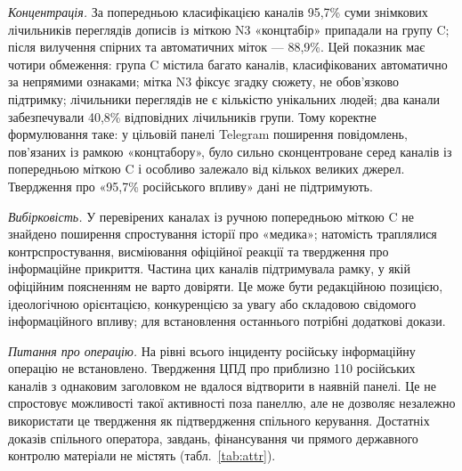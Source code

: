 \emph{Концентрація.} За попередньою класифікацією каналів 95,7\% суми знімкових лічильників переглядів дописів із міткою N3 «концтабір» припадали на групу C; після вилучення спірних та автоматичних міток --- 88,9\%. Цей показник має чотири обмеження: група C містила багато каналів, класифікованих автоматично за непрямими ознаками; мітка N3 фіксує згадку сюжету, не обов'язково підтримку; лічильники переглядів не є кількістю унікальних людей; два канали забезпечували 40,8\% відповідних лічильників групи. Тому коректне формулювання таке: у цільовій панелі Telegram поширення повідомлень, пов'язаних із рамкою «концтабору», було сильно сконцентроване серед каналів із попередньою міткою C і особливо залежало від кількох великих джерел. Твердження про «95,7\% російського впливу» дані не підтримують.

\emph{Вибірковість.} У перевірених каналах із ручною попередньою міткою C не знайдено поширення спростування історії про «медика»; натомість траплялися контрспростування, висміювання офіційної реакції та твердження про інформаційне прикриття. Частина цих каналів підтримувала рамку, у якій офіційним поясненням не варто довіряти. Це може бути редакційною позицією, ідеологічною орієнтацією, конкуренцією за увагу або складовою свідомого інформаційного впливу; для встановлення останнього потрібні додаткові докази.

\emph{Питання про операцію.} На рівні всього інциденту російську інформаційну операцію не встановлено. Твердження ЦПД про приблизно 110 російських каналів з однаковим заголовком не вдалося відтворити в наявній панелі. Це не спростовує можливості такої активності поза панеллю, але не дозволяє незалежно використати це твердження як підтвердження спільного керування. Достатніх доказів спільного оператора, завдань, фінансування чи прямого державного контролю матеріали не містять (табл.~\ref{tab:attr}).

